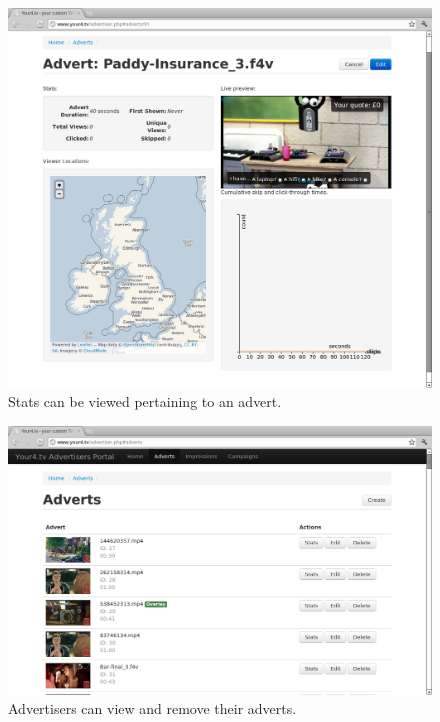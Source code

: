 \begin{figure}[th]
	\centering
	\includegraphics[width=\textwidth,height=0.5\textheight,keepaspectratio]{images/screenshots/advertiser-advert.png}
	\caption{Stats can be viewed pertaining to an advert.}
	\label{fig:advertiser-advert}
\end{figure}
\begin{figure}[th]
	\centering
	\includegraphics[width=\textwidth,height=0.5\textheight,keepaspectratio]{images/screenshots/advertiser-adverts.png}
	\caption{Advertisers can view and remove their adverts.}
	\label{fig:advertiser-adverts}
\end{figure}
